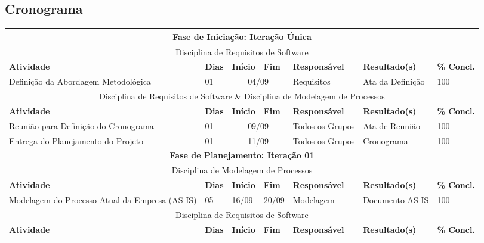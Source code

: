 	\begin{landscape}	
	\section[Cronograma]{Cronograma}
	\label{sec:planejamento_cronograma}
		\begin{center}
			\begin{tabular}{|m{6cm}|m{1cm}|m{1cm}|m{1cm}|m{4cm}|m{6cm}|m{2cm}|}
			\hline
			\multicolumn{7}{|c|}{\textbf{Fase de Iniciação: Iteração Única}} \\
			\hline
			\multicolumn{7}{|c|}{Disciplina de Requisitos de Software} \\
			\hline
			\textbf{Atividade} & \textbf{Dias} & \textbf{Início} & \textbf{Fim} & \textbf{Responsável} & \textbf{Resultado(s)} & \textbf{\% Concl.} \\ \hline 
			Definição da Abordagem Metodológica & 01 & \multicolumn{2}{c|}{04/09} & Requisitos & Ata da Definição & 100 \\ \hline
			\multicolumn{7}{|c|}{Disciplina de Requisitos de Software \& Disciplina de Modelagem de Processos} \\
			\hline
			\textbf{Atividade} & \textbf{Dias} & \textbf{Início} & \textbf{Fim} & \textbf{Responsável} & \textbf{Resultado(s)} & \textbf{\% Concl.} \\ \hline 
			Reunião para Definição do Cronograma & 01 & \multicolumn{2}{c|}{09/09} & Todos os Grupos & Ata de Reunião & 100 \\ \hline
			Entrega do Planejamento do Projeto & 01 & \multicolumn{2}{c|}{11/09} & Todos os Grupos & Cronograma & 100 \\ \hline
			\multicolumn{7}{|c|}{\textbf{Fase de Planejamento: Iteração 01}} \\
			\hline
			\multicolumn{7}{|c|}{Disciplina de Modelagem de Processos} \\
			\hline
			\textbf{Atividade} & \textbf{Dias} & \textbf{Início} & \textbf{Fim} & \textbf{Responsável} & \textbf{Resultado(s)} & \textbf{\% Concl.} \\ \hline
			Modelagem do Processo Atual da Empresa (AS-IS) & 05 & 16/09 & 20/09 & Modelagem & Documento AS-IS & 100 \\ \hline
			\multicolumn{7}{|c|}{Disciplina de Requisitos de Software} \\
			\hline
			\textbf{Atividade} & \textbf{Dias} & \textbf{Início} & \textbf{Fim} & \textbf{Responsável} & \textbf{Resultado(s)} & \textbf{\% Concl.} \\ \hline

\end{tabular}
\end{center}
\end{landscape}
